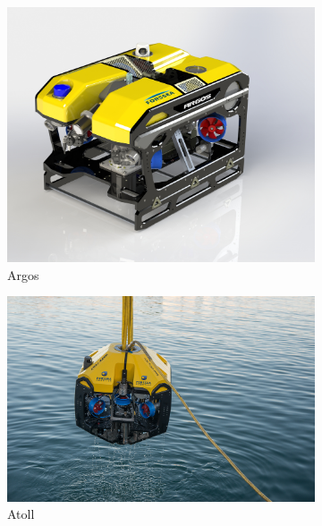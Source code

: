     \begin{figure}[!htb]
        \centering
        \begin{subfigure}[b]{0.3\textwidth}
            \centering
            \includegraphics[width=\textwidth]{imgs/Argos.jpg}
            \caption{\gls{Argos}}
        \end{subfigure}
        \hfill
        \begin{subfigure}[b]{0.3\textwidth}
            \centering
            \includegraphics[width=\textwidth]{imgs/Atoll.jpg}
            \caption{\gls{Atoll}}
        \end{subfigure}
        \hfill
        \begin{subfigure}[b]{0.3\textwidth}
            \centering

\end{subfigure}
\end{figure}

